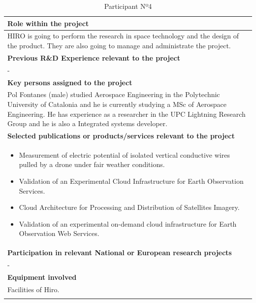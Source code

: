 \begin{longtable}[H]{|p{0.7cm}|p{4cm}|p{7cm}|p{1.3cm}|}
	\multicolumn{4}{|p{13cm}|}{\textbf{Role within the project}}   \\ \hline
	
	\multicolumn{4}{|p{14.5cm}|}{HIRO is going to perform the research in space technology and the design of the product. They are also going to manage and administrate the project.}  \\ \hline
	
	\multicolumn{4}{|p{13cm}|}{\textbf{Previous R\&D Experience relevant to the project}}  \\ \hline
	
	\multicolumn{4}{|p{14.5cm}|}{-}  \\ \hline
	
	\multicolumn{4}{|p{13cm}|}{\textbf{Key persons assigned to the project}}   \\ \hline
	
	\multicolumn{4}{|p{14.5cm}|}{Pol Fontanes (male) studied Aerospace Engineering in the Polytechnic University of Catalonia and he is currently studying a MSc of Aerospace Engineering. He has experience as a researcher in the UPC Lightning Research Group and he is also a Integrated systems developer.} \\ \hline
	
	\multicolumn{4}{|p{13cm}|}{\textbf{Selected publications or products/services relevant to the project}}  \\ \hline
	
	\multicolumn{4}{|p{14.5cm}|}{
		\begin{itemize}
			\item Measurement of electric potential of isolated vertical conductive wires pulled by a drone under fair weather conditions.
			\item Validation of an Experimental Cloud Infrastructure for Earth Observation Services.
			\item Cloud Architecture for Processing and Distribution of Satellites Imagery.
			\item Validation of an experimental on-demand cloud infrastructure for Earth Observation Web Services.
		\end{itemize}}  \\ \hline
	
	\multicolumn{4}{|p{13cm}|}{\textbf{Participation in relevant National or European research projects}}  \\ \hline
	
	\multicolumn{4}{|p{14.5cm}|}{-}  \\ \hline
	
	\multicolumn{4}{|p{13cm}|}{\textbf{Equipment involved}}  \\ \hline
	
	\multicolumn{4}{|p{14.5cm}|}{Facilities of Hiro.}  \\ \hline
	\caption{Participant Nº4}
\end{longtable}



